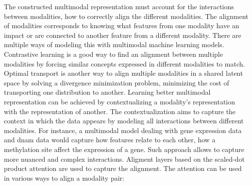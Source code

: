 \documentclass[../main.tex]{subfiles}
\begin{document}
	  The constructed multimodal representation must account for the interactions between modalities, \ie{}how to correctly align the different modalities.
	  The alignment of modalities corresponds to knowing what features from one modality have an impact or are connected to another feature from a different modality.
	  There are multiple ways of modeling this with multimodal machine learning models.
	  Contrastive learning is a good way to find an alignment between multiple modalities by forcing similar concepts expressed in different modalities to match.
	  Optimal transport is another way to align multiple modalities in a shared latent space by solving a divergence minimization problem, \ie{}minimizing the cost of transporting one distribution to another.
	  Learning better multimodal representation can be achieved by contextualizing a modality's representation with the representation of another.
	  The contextualization aims to capture the context in which the data appears by modeling all interactions between different modalities.
	  For instance, a multimodal model dealing with gene expression data and \gls{dnam} data would capture how features relate to each other, \ie{}how a methylation site affect the expression of a gene.
	  Such approach allows to capture more nuanced and complex interactions.
	  Aligment layers based on the scaled-dot product attention are used to capture the alignment.
	  The attention can be used in various ways to align a modality pair:
\end{document}
